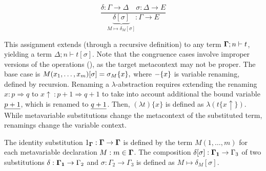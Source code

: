 \begin{figure}
{\begin{minipage}[t]{1\columnwidth - 2\fboxsep - 2\fboxrule}
\begin{minipage}[c]{0.6\columnwidth}%
\begin{flushleft}
%
\par\end{flushleft}%
\end{minipage}%
\begin{minipage}[c]{0.29\columnwidth}%
\begin{flushleft}
\[
\dfrac{\delta:\Gamma\rightarrow\Delta\quad\sigma:\Delta\rightarrow E}{\underbrace{\delta[\sigma]}_{M\mapsto\delta_{M}[\sigma]}:\Gamma\rightarrow E}
\]
\par\end{flushleft}%
\end{minipage}%
\end{minipage}}

\end{figure}

This assignment extends (through a recursive definition) to any term
$\boldsymbol{\Gamma};n\vdash t$, yielding a term $\Delta;n\vdash t[\sigma]$.
Note that the congruence cases involve improper versions of the operations
(), as the target metacontext may not
be proper. The base case is $M(x_{1},\dots,x_{m})[\sigma]=\sigma_{M}\{x\},$
where $-\{x\}$ is variable renaming, defined by recursion. Renaming
a $\lambda$-abstraction requires extending the renaming $x:p\Rightarrow q$
to $x\uparrow\ :p+1\Rightarrow q+1$ to take into account additional
the bound variable $\underline{p+1}$, which is renamed to $\underline{q+1}$.
Then, $(\lambda t)\{x\}$ is defined as $\lambda(t\{x\uparrow\})$.
While metavariable substitutions change the metacontext of the substituted
term, renamings change the variable context.

The identity substitution $1_{\boldsymbol{\Gamma}}:\boldsymbol{\Gamma}\rightarrow\boldsymbol{\Gamma}$
is defined by the term $M(1,\dots,m)$ for each metavariable declaration
$M:m\in\boldsymbol{\Gamma}$. The composition $\delta[\sigma]:\boldsymbol{\Gamma_{1}}\rightarrow\Gamma_{3}$
of two substitutions $\delta:\boldsymbol{\Gamma_{1}}\rightarrow\Gamma_{2}$
and $\sigma:\Gamma_{2}\rightarrow\Gamma_{3}$ is defined as $M\mapsto\delta_{M}[\sigma]$. 

